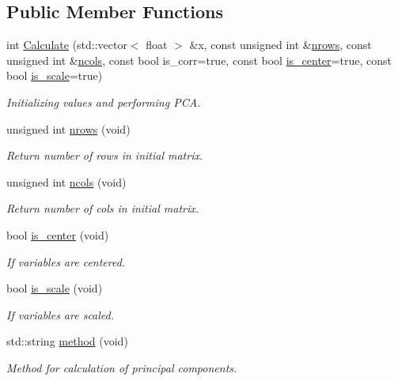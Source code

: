 \subsection*{Public Member Functions}
\begin{DoxyCompactItemize}
\item 
int \hyperlink{classPca_a69bab38091166e75c71a20952c4c9ef4}{Calculate} (std\+::vector$<$ float $>$ \&x, const unsigned int \&\hyperlink{classPca_a1de7db7c35c005e7920dd95579ae820b}{nrows}, const unsigned int \&\hyperlink{classPca_ab3e3ef5de29c495ad8b8ad7ed0ae2bbe}{ncols}, const bool is\+\_\+corr=true, const bool \hyperlink{classPca_a756656415dc43a2a68f4394f719351b2}{is\+\_\+center}=true, const bool \hyperlink{classPca_acf41e5dccf22ba87069b3eb1bc586307}{is\+\_\+scale}=true)
\begin{DoxyCompactList}\small\item\em Initializing values and performing P\+CA. \end{DoxyCompactList}\item 
unsigned int \hyperlink{classPca_a1de7db7c35c005e7920dd95579ae820b}{nrows} (void)
\begin{DoxyCompactList}\small\item\em Return number of rows in initial matrix. \end{DoxyCompactList}\item 
unsigned int \hyperlink{classPca_ab3e3ef5de29c495ad8b8ad7ed0ae2bbe}{ncols} (void)
\begin{DoxyCompactList}\small\item\em Return number of cols in initial matrix. \end{DoxyCompactList}\item 
bool \hyperlink{classPca_a756656415dc43a2a68f4394f719351b2}{is\+\_\+center} (void)
\begin{DoxyCompactList}\small\item\em If variables are centered. \end{DoxyCompactList}\item 
bool \hyperlink{classPca_acf41e5dccf22ba87069b3eb1bc586307}{is\+\_\+scale} (void)
\begin{DoxyCompactList}\small\item\em If variables are scaled. \end{DoxyCompactList}\item 
std\+::string \hyperlink{classPca_aecaeb63b64fe48f9307ee89075ed6929}{method} (void)
\begin{DoxyCompactList}\small\item\em Method for calculation of principal components. \end{DoxyCompactList}\item 

\end{DoxyCompactItemize}
